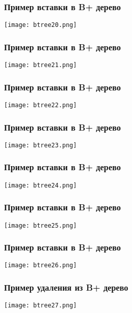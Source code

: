 \begin{frame}
\frametitle{Пример вставки в B+ дерево}
\begin{center}
  \texttt{[image: btree20.png]}
\end{center}
\end{frame}

\begin{frame}
\frametitle{Пример вставки в B+ дерево}
\begin{center}
  \texttt{[image: btree21.png]}
\end{center}
\end{frame}

\begin{frame}
\frametitle{Пример вставки в B+ дерево}
\begin{center}
  \texttt{[image: btree22.png]}
\end{center}
\end{frame}

\begin{frame}
\frametitle{Пример вставки в B+ дерево}
\begin{center}
  \texttt{[image: btree23.png]}
\end{center}
\end{frame}

\begin{frame}
\frametitle{Пример вставки в B+ дерево}
\begin{center}
  \texttt{[image: btree24.png]}
\end{center}
\end{frame}

\begin{frame}
\frametitle{Пример вставки в B+ дерево}
\begin{center}
  \texttt{[image: btree25.png]}
\end{center}
\end{frame}

\begin{frame}
\frametitle{Пример вставки в B+ дерево}
\begin{center}
  \texttt{[image: btree26.png]}
\end{center}
\end{frame}

\begin{frame}
\frametitle{Пример удаления из B+ дерево}
\begin{center}
  \texttt{[image: btree27.png]}
\end{center}
\end{frame}

